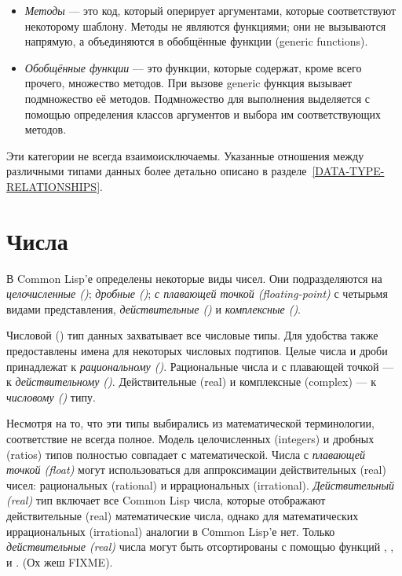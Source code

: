 \begin{itemize}
\item
\emph{Методы} --- это код, который оперирует аргументами, которые
соответствуют некоторому шаблону. Методы не являются функциями; они
не вызываются напрямую, а объединяются в обобщённые функции (generic
functions). 

\item
\emph{Обобщённые функции} --- это функции, которые содержат, кроме всего
прочего, множество методов. При вызове generic функция вызывает
подмножество её методов. Подмножество для выполнения выделяется с
помощью определения классов аргументов и выбора им соответствующих
методов. 
\end{itemize}

Эти категории не всегда взаимоисключаемы. Указанные отношения
между различными типами данных более детально описано в
разделе~\ref{DATA-TYPE-RELATIONSHIPS}.

\section{Числа}

В Common Lisp'е определены некоторые виды чисел. Они
подразделяются на \emph{целочисленные ()}; \emph{дробные ()};
\emph{с плавающей точкой (floating-point)} с 
четырьмя видами представления, \emph{действительные ()} и
\emph{комплексные ()}.

Числовой () тип данных захватывает все числовые типы. Для удобства
также предоставлены имена для некоторых числовых
подтипов. Целые числа и дроби принадлежат к
\emph{рациональному ()}. Рациональные числа и с плавающей точкой --- к
\emph{действительному ()}. Действительные (real) и комплексные (complex) --- к
\emph{числовому ()} типу.

Несмотря на то, что эти типы выбирались из математической
терминологии, соответствие не всегда полное. Модель целочисленных
(integers) и дробных (ratios) типов полностью совпадает с
математической. Числа с \emph{плавающей точкой (float)} могут
использоваться для аппроксимации действительных (real) чисел:
рациональных (rational) и иррациональных
(irrational). \emph{Действительный (real)} тип включает все Common Lisp
числа, которые отображают действительные (real) математические числа,
однако для математических иррациональных (irrational) аналогии в Cоmmon Lisp'е
нет. Только \emph{действительные (real)} числа могут быть отсортированы с
помощью функций \cdf{<}, \cdf{>}, \cdf{<=} и \cdf{>=}. (Ох жеш FIXME). 

